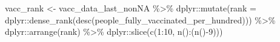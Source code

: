\documentclass[
]{book}
\newenvironment{Shaded}{\begin{snugshade}}{\end{snugshade}}
\newcommand{\AttributeTok}[1]{\textcolor[rgb]{0.77,0.63,0.00}{#1}}
\newcommand{\DecValTok}[1]{\textcolor[rgb]{0.00,0.00,0.81}{#1}}
\newcommand{\FunctionTok}[1]{\textcolor[rgb]{0.00,0.00,0.00}{#1}}
\newcommand{\NormalTok}[1]{#1}
\newcommand{\OtherTok}[1]{\textcolor[rgb]{0.56,0.35,0.01}{#1}}
\newcommand{\SpecialCharTok}[1]{\textcolor[rgb]{0.00,0.00,0.00}{#1}}
\begin{document}
\begin{Shaded}
\begin{Highlighting}[]
\NormalTok{vacc\_rank }\OtherTok{\textless{}{-}}\NormalTok{ vacc\_data\_last\_nonNA }\SpecialCharTok{\%\textgreater{}\%} 
\NormalTok{  dplyr}\SpecialCharTok{::}\FunctionTok{mutate}\NormalTok{(}\AttributeTok{rank =}\NormalTok{ dplyr}\SpecialCharTok{::}\FunctionTok{dense\_rank}\NormalTok{(}\FunctionTok{desc}\NormalTok{(people\_fully\_vaccinated\_per\_hundred))) }\SpecialCharTok{\%\textgreater{}\%} 
\NormalTok{  dplyr}\SpecialCharTok{::}\FunctionTok{arrange}\NormalTok{(rank) }\SpecialCharTok{\%\textgreater{}\%} 
\NormalTok{  dplyr}\SpecialCharTok{::}\FunctionTok{slice}\NormalTok{(}\FunctionTok{c}\NormalTok{(}\DecValTok{1}\SpecialCharTok{:}\DecValTok{10}\NormalTok{, }\FunctionTok{n}\NormalTok{()}\SpecialCharTok{:}\NormalTok{(}\FunctionTok{n}\NormalTok{()}\SpecialCharTok{{-}}\DecValTok{9}\NormalTok{)))}


\end{Highlighting}
\end{Shaded}
\end{document}
